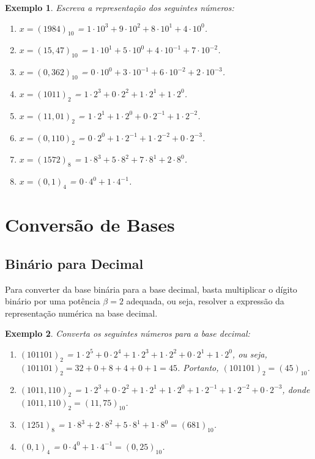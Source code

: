 \documentclass[12pt,a4paper]{book}
\newtheorem{example}{Exemplo}
\begin{document}
\begin{example}
	Escreva a representação dos seguintes números:
	\begin{enumerate}
	    \item $x=(1984)_{10}$ = $1\cdot 10^3 + 9\cdot 10^2 + 8\cdot 10^1 + 4\cdot 10^0$.
	    \item $x=(15,47)_{10}$ = $1\cdot 10^1 + 5\cdot 10^0 + 4\cdot 10^{-1} + 7\cdot 10^{-2}$.
    	\item $x=(0,362)_{10}$ = $0\cdot 10^0 + 3\cdot 10^{-1} + 6\cdot 10^{-2} + 2\cdot 10^{-3}$.
    	\item $x=(1011)_{2}$ = $1\cdot 2^3 + 0\cdot 2^2 + 1 \cdot 2^1 + 1 \cdot 2^0$.
    	\item $x=(11,01)_{2}$ = $1\cdot 2^1 + 1\cdot 2^0 + 0\cdot 2^{-1} + 1\cdot 2^{-2}$.
    	\item $x=(0,110)_{2}$ = $0\cdot 2^0 + 1\cdot 2^{-1} + 1\cdot 2^{-2} + 0\cdot 2^{-3}$.
    	\item $x=(1572)_{8}$ = $1\cdot 8^3 + 5\cdot 8^2 + 7\cdot 8^1 + 2\cdot 8^0$.
    	\item $x=(0,1)_{4}$ = $0\cdot 4^0 + 1 \cdot 4^{-1}$.
	\end{enumerate}
\end{example}

\section{Conversão de Bases}

\subsection{Binário para Decimal}

Para converter da base binária para a base decimal, basta multiplicar o dígito binário por uma potência $\beta=2$ adequada, ou seja, resolver a expressão da representação numérica na base decimal.

\begin{example}
    Converta os seguintes números para a base decimal:
    \begin{enumerate}
        \item $(101101)_{2}$ = $1\cdot 2^5 + 0\cdot 2^4 + 1 \cdot 2^3 + 1 \cdot 2^2 + 0\cdot 2^1 + 1\cdot 2^0$, ou seja, $(101101)_{2} = 32 + 0 + 8 + 4 + 0 + 1 = 45$. Portanto, $(101101)_{2}=(45)_{10}$.
        \item $(1011,110)_{2}$ = $1\cdot 2^3 + 0 \cdot 2^2 + 1 \cdot 2^1 + 1 \cdot 2^0 + 1 \cdot 2^{-1} + 1\cdot 2^{-2} + 0 \cdot 2^{-3}$, donde $(1011,110)_{2}=(11,75)_{10}$.
        \item $(1251)_{8}$ = $1\cdot 8^3 + 2 \cdot 8^2 + 5\cdot 8^1 + 1\cdot 8^0 = (681)_{10}$.
        \item $(0,1)_{4}$ = $0\cdot 4^0 + 1 \cdot 4^{-1}=(0,25)_{10}$.
    \end{enumerate}
\end{example}
\end{document}
